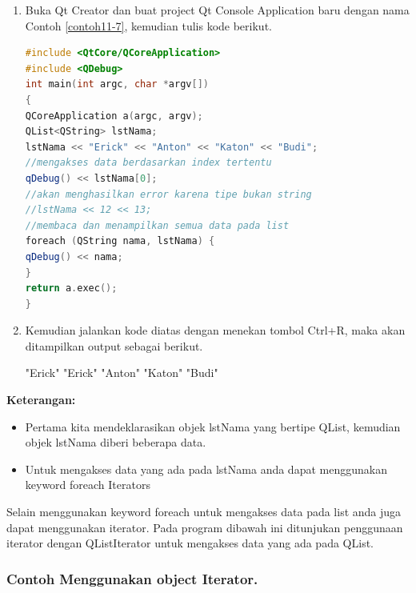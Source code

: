 \begin{enumerate}

\item
  Buka Qt Creator dan buat project Qt Console Application baru dengan
  nama Contoh \ref{contoh11-7}, kemudian tulis kode berikut.

\begin{lstlisting}[language=c++, caption=Menggunakan QList,label=contoh11-7]
#include <QtCore/QCoreApplication>
#include <QDebug>
int main(int argc, char *argv[])
{
QCoreApplication a(argc, argv);
QList<QString> lstNama;
lstNama << "Erick" << "Anton" << "Katon" << "Budi";
//mengakses data berdasarkan index tertentu
qDebug() << lstNama[0];
//akan menghasilkan error karena tipe bukan string
//lstNama << 12 << 13;
//membaca dan menampilkan semua data pada list
foreach (QString nama, lstNama) {
qDebug() << nama;
}
return a.exec();
}
\end{lstlisting}
\item
  Kemudian jalankan kode diatas dengan menekan tombol Ctrl+R, maka akan
  ditampilkan output sebagai berikut.
  
\begin{lcverbatim}
"Erick"
"Erick"
"Anton"
"Katon"
"Budi"
\end{lcverbatim}
\end{enumerate}

\textbf{Keterangan:}

\begin{itemize}

\item
  Pertama kita mendeklarasikan objek lstNama yang bertipe QList,
  kemudian objek lstNama diberi beberapa data.
\item
  Untuk mengakses data yang ada pada lstNama anda dapat menggunakan
  keyword foreach Iterators
\end{itemize}

Selain menggunakan keyword foreach untuk mengakses data pada list anda
juga dapat menggunakan iterator. Pada program dibawah ini ditunjukan
penggunaan iterator dengan QListIterator untuk mengakses data yang ada
pada QList.

\subsubsection*{Contoh  Menggunakan object Iterator.}

